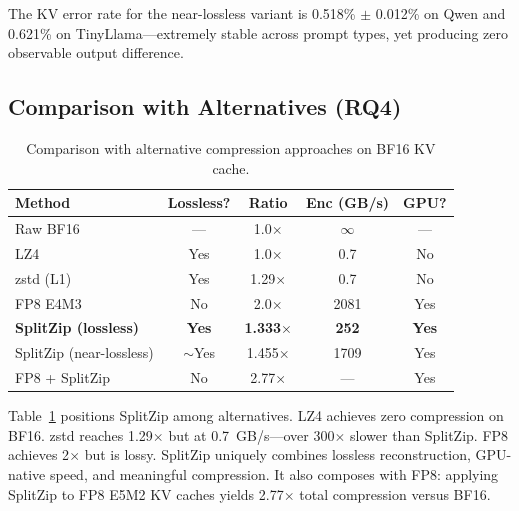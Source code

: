The KV error rate for the near-lossless variant is 0.518\% $\pm$ 0.012\% on Qwen and 0.621\% on TinyLlama---extremely stable across prompt types, yet producing zero observable output difference.

\subsection{Comparison with Alternatives (RQ4)}

\begin{table}[t]
\centering
\small
\caption{Comparison with alternative compression approaches on BF16 KV cache.}
\label{tab:baselines}
\begin{tabular}{lcccc}
\toprule
Method & Lossless? & Ratio & Enc (GB/s) & GPU? \\
\midrule
Raw BF16 & --- & 1.0$\times$ & $\infty$ & --- \\
LZ4 & Yes & 1.0$\times$ & 0.7 & No \\
zstd (L1) & Yes & 1.29$\times$ & 0.7 & No \\
FP8 E4M3 & No & 2.0$\times$ & 2081 & Yes \\
\textbf{SplitZip (lossless)} & \textbf{Yes} & \textbf{1.333$\times$} & \textbf{252} & \textbf{Yes} \\
SplitZip (near-lossless) & $\sim$Yes & 1.455$\times$ & 1709 & Yes \\
FP8 + SplitZip & No & 2.77$\times$ & --- & Yes \\
\bottomrule
\end{tabular}
\end{table}

Table~\ref{tab:baselines} positions SplitZip among alternatives. LZ4 achieves zero compression on BF16. zstd reaches 1.29$\times$ but at 0.7~GB/s---over 300$\times$ slower than SplitZip. FP8 achieves 2$\times$ but is lossy. SplitZip uniquely combines lossless reconstruction, GPU-native speed, and meaningful compression. It also composes with FP8: applying SplitZip to FP8 E5M2 KV caches yields 2.77$\times$ total compression versus BF16.
